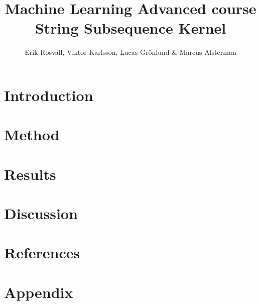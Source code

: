 \documentclass[10pt,a4paper,titlepage]{article}
\author{Erik Rosvall, Viktor Karlsson, Lucas Grönlund \& Marcus Alsterman}
\title{Machine Learning Advanced course \\ String Subsequence Kernel}
\begin{document}
	\maketitle
	
	\section{Introduction}
	
	
	\section{Method}
	
	
	\section{Results}
	
	
	\section{Discussion}
	
	
	\section{References}
	
	
	\section*{Appendix}
	
\end{document}
